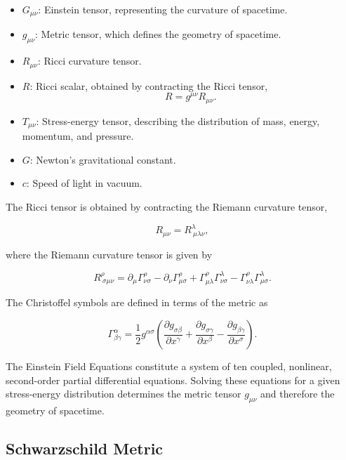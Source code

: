 \documentclass[12pt]{article}
\begin{document}
\begin{itemize}
    \item $G_{\mu\nu}$: Einstein tensor, representing the curvature of spacetime.
    \item $g_{\mu\nu}$: Metric tensor, which defines the geometry of spacetime.
    \item $R_{\mu\nu}$: Ricci curvature tensor.
    \item $R$: Ricci scalar, obtained by contracting the Ricci tensor,
    \[
    R = g^{\mu\nu}R_{\mu\nu}.
    \]
    \item $T_{\mu\nu}$: Stress-energy tensor, describing the distribution of mass, energy, momentum, and pressure.
    \item $G$: Newton's gravitational constant.
    \item $c$: Speed of light in vacuum.
\end{itemize}

The Ricci tensor is obtained by contracting the Riemann curvature tensor,

\begin{equation}
R_{\mu\nu}
=
R^{\lambda}_{\ \mu\lambda\nu},
\end{equation}

where the Riemann curvature tensor is given by

\begin{equation}
R^{\rho}_{\ \sigma\mu\nu}
=
\partial_{\mu}\Gamma^{\rho}_{\nu\sigma}
-
\partial_{\nu}\Gamma^{\rho}_{\mu\sigma}
+
\Gamma^{\rho}_{\mu\lambda}\Gamma^{\lambda}_{\nu\sigma}
-
\Gamma^{\rho}_{\nu\lambda}\Gamma^{\lambda}_{\mu\sigma}.
\end{equation}

The Christoffel symbols are defined in terms of the metric as

\begin{equation}
\Gamma^{\alpha}_{\beta\gamma}
=
\frac{1}{2}
g^{\alpha\sigma}
\left(
\frac{\partial g_{\sigma\beta}}{\partial x^{\gamma}}
+
\frac{\partial g_{\sigma\gamma}}{\partial x^{\beta}}
-
\frac{\partial g_{\beta\gamma}}{\partial x^{\sigma}}
\right).
\end{equation}

The Einstein Field Equations constitute a system of ten coupled, nonlinear, second-order partial differential equations. Solving these equations for a given stress-energy distribution determines the metric tensor $g_{\mu\nu}$ and therefore the geometry of spacetime.

\subsection{Schwarzschild Metric}
\end{document}
